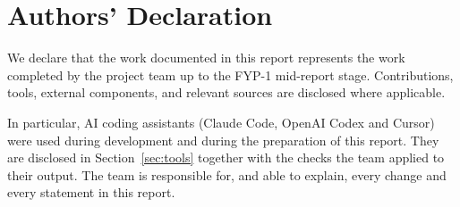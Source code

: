 \chapter*{Authors' Declaration}
We declare that the work documented in this report represents the work completed by the project team up to the FYP-1 mid-report stage. Contributions, tools, external components, and relevant sources are disclosed where applicable.

In particular, AI coding assistants (Claude Code, OpenAI Codex and Cursor) were used during development and during the preparation of this report. They are disclosed in Section~\ref{sec:tools} together with the checks the team applied to their output. The team is responsible for, and able to explain, every change and every statement in this report.
